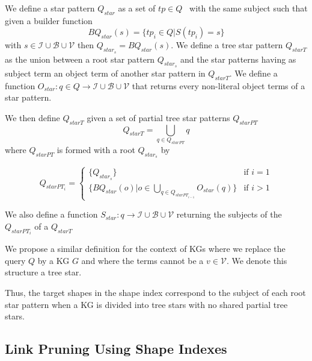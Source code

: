 \begin{definition}\label{def:starPattern}
   We define a star pattern $Q_{star}$ as a set of $tp \in Q$~\cite{Karim2020} with the same subject such that 
   given a builder function 
   \begin{equation}
       BQ_{star}(s) = \{tp_i \in Q| S(tp_i) = s\}
   \end{equation}
   with $s \in \mathcal{I} \cup \mathcal{B} \cup \mathcal{V}$ then $Q_{star_s} = BQ_{star}(s)$.
   We define a tree star pattern $Q_{starT}$ as the union between a root star pattern $Q_{star_s}$
   and the star patterns having as subject term an object term of another star pattern in $Q_{starT}$.
   We define a function 
   $O_{star}: q \in Q \rightarrow  \mathcal{I} \cup \mathcal{B} \cup \mathcal{V}$
   that returns every non-literal object terms of a star pattern.

   We then define $Q_{starT}$ given a  set of partial tree star patterns $Q_{starPT}$
   \begin{equation}
       Q_{starT} = \bigcup_{q \in Q_{starPT}} q
   \end{equation}
   where $Q_{starPT}$ is formed with a root $Q_{star_s}$ by

   \begin{equation}
           Q_{starPT_i} =
       \begin{cases}
           \{Q_{star_s}\} & \text{if } i = 1 \\
           \{BQ_{star}(o)| o \in \bigcup\limits_{q \in Q_{starPT_{i-1}}} O_{star}(q)\} & \text{if } i>1
       \end{cases}
   \end{equation}

   We also define a function  
   $S_{star}: q \rightarrow  \mathcal{I} \cup \mathcal{B} \cup \mathcal{V}$
   returning the subjects of the $Q_{starPT_i}$ of a $Q_{starT}$

   We propose a similar definition for the context of KGs where we replace the query $Q$ by a KG $G$ and where the terms 
   cannot be a $v \in \mathcal{V}$. 
   We denote this structure a tree star.
\end{definition}
Thus, the target shapes in the shape index correspond to the subject of each root star pattern when a KG is divided into tree stars with no shared partial tree stars.

\subsection{Link Pruning Using Shape Indexes}\label{sec:sourceSelection}

